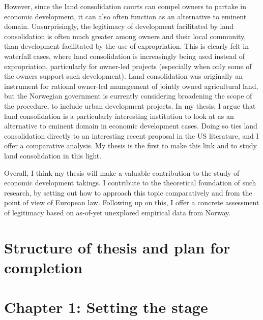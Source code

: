 \documentclass[12pt,a4paper]{article} %
\begin{document}
However, since the land consolidation courts can compel owners to partake in economic development, it can also often function as an alternative to eminent domain. Unsurprisingly, the legitimacy of development facilitated by land consolidation is often much greater among owners and their local community, than development facilitated by the use of expropriation. This is clearly felt in waterfall cases, where land consolidation is increasingly being used instead of expropriation, particularly for owner-led projects (especially when only some of the owners support such development). Land consolidation was originally an instrument for rational owner-led management of jointly owned agricultural land, but the Norwegian government is currently considering broadening the scope of the procedure, to include urban development projects. In my thesis, I argue that land consolidation is a particularly interesting institution to look at as an alternative to eminent domain in economic development cases. Doing so ties land consolidation directly to an interesting recent proposal in the US literature, and I offer a comparative analysis. My thesis is the first to make this link and to study land consolidation in this light.

Overall, I think my thesis will make a valuable contribution to the study of economic development takings. I contribute to the theoretical foundation of such research, by setting out how to approach this topic comparatively and from the point of view of European law. Following up on this, I offer a concrete assessment of legitimacy based on as-of-yet unexplored empirical data from Norway.

\section*{Structure of thesis and plan for completion}


\section*{Chapter 1: Setting the stage}
\end{document}
